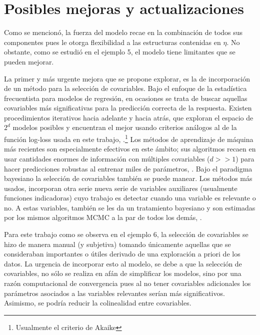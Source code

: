 \documentclass[../Main/Main.tex]{subfiles}
\begin{document}
\section{Posibles mejoras y actualizaciones}
Como se mencionó, la fuerza del modelo recae en la combinación de todos sus componentes pues le otorga flexibilidad a las estructuras contenidas en $\eta$. No obstante, como se estudió en el ejemplo 5, el modelo tiene limitantes que se pueden mejorar. 

La primer y más urgente mejora que se propone explorar, es la de incorporación de un método para la selección de covariables. Bajo el enfoque de la estadística frecuentista para modelos de regresión, en ocasiones se trata de buscar aquellas covariables más significativas para la predicción correcta de la respuesta. Existen procedimientos iterativos hacia adelante y hacia atrás, que exploran el espacio de $2^d$ modelos posibles y encuentran el mejor usando criterios análogos al de la función log-loss usada en este trabajo, \citet{bishop2006pattern}.\footnote{Usualmente el criterio de Akaike} Los métodos de aprendizaje de máquina más recientes son especialmente efectivos en este ámbito; sus algoritmos recaen en usar cantidades enormes de información con múltiples covariables ($d>>1$) para hacer predicciones robustas al entrenar miles de parámetros, \citet{nielsen2015neural}. Bajo el paradigma bayesiano la selección de covariables también se puede manear. Los métodos más usados, incorporan otra serie nueva serie de variables auxiliares (usualmente funciones indicadoras) cuyo trabajo es detectar cuando una variable es relevante o no. A estas variables, también se les da un tratamiento bayesiano y son estimadas por los mismos algoritmos MCMC a la par de todos los demás, \citet{o2009review}.

Para este trabajo como se observa en el ejemplo 6, la selección de covariables se hizo de manera manual (y subjetiva) tomando únicamente aquellas que se consideraban importantes o útiles derivado de una exploración a priori de los datos. La urgencia de incorporar esto al modelo, se debe a que la selección de covariables, no sólo se realiza en afán de simplificar los modelos, sino por una razón computacional de convergencia pues al no tener covariables adicionales los parámetros asociados a las variables relevantes serían más significativos. Asimismo, se podría reducir la colinealidad entre covariables.
\end{document}
